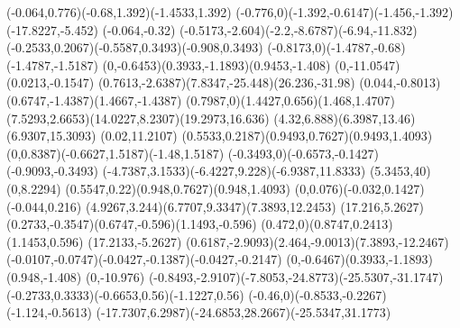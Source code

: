 {    \rcurveto(-0.064,0.776)(-0.68,1.392)(-1.4533,1.392) %
    \rcurveto(-0.776,0)(-1.392,-0.6147)(-1.456,-1.392) %
    \rlineto(-17.8227,-5.452) %
    \rlineto(-0.064,-0.32) %
    \rcurveto(-0.5173,-2.604)(-2.2,-8.6787)(-6.94,-11.832) %
    \rcurveto(-0.2533,0.2067)(-0.5587,0.3493)(-0.908,0.3493) %
    \rcurveto(-0.8173,0)(-1.4787,-0.68)(-1.4787,-1.5187) %
    \rcurveto(0,-0.6453)(0.3933,-1.1893)(0.9453,-1.408) %
    \rlineto(0,-11.0547) %
    \rlineto(0.0213,-0.1547) %
    \rcurveto(0.7613,-2.6387)(7.8347,-25.448)(26.236,-31.98) %
    \rcurveto(0.044,-0.8013)(0.6747,-1.4387)(1.4667,-1.4387) %
    \rcurveto(0.7987,0)(1.4427,0.656)(1.468,1.4707) %
    \rcurveto(7.5293,2.6653)(14.0227,8.2307)(19.2973,16.636) %
    \rcurveto(4.32,6.888)(6.3987,13.46)(6.9307,15.3093) %
    \rlineto(0.02,11.2107) %
    \rcurveto(0.5533,0.2187)(0.9493,0.7627)(0.9493,1.4093) %
    \rcurveto(0,0.8387)(-0.6627,1.5187)(-1.48,1.5187) %
    \rcurveto(-0.3493,0)(-0.6573,-0.1427)(-0.9093,-0.3493) %
    \rcurveto(-4.7387,3.1533)(-6.4227,9.228)(-6.9387,11.8333) %
    \closepath %
    \moveto(5.3453,40) %
    \rlineto(0,8.2294) %
    \rcurveto(0.5547,0.22)(0.948,0.7627)(0.948,1.4093) %
    \rcurveto(0,0.076)(-0.032,0.1427)(-0.044,0.216) %
    \rcurveto(4.9267,3.244)(6.7707,9.3347)(7.3893,12.2453) %
    \rlineto(17.216,5.2627) %
    \rcurveto(0.2733,-0.3547)(0.6747,-0.596)(1.1493,-0.596) %
    \rcurveto(0.472,0)(0.8747,0.2413)(1.1453,0.596) %
    \rlineto(17.2133,-5.2627) %
    \rcurveto(0.6187,-2.9093)(2.464,-9.0013)(7.3893,-12.2467) %
    \rcurveto(-0.0107,-0.0747)(-0.0427,-0.1387)(-0.0427,-0.2147) %
    \rcurveto(0,-0.6467)(0.3933,-1.1893)(0.948,-1.408) %
    \rlineto(0,-10.976) %
    \rcurveto(-0.8493,-2.9107)(-7.8053,-24.8773)(-25.5307,-31.1747) %
    \rcurveto(-0.2733,0.3333)(-0.6653,0.56)(-1.1227,0.56) %
    \rcurveto(-0.46,0)(-0.8533,-0.2267)(-1.124,-0.5613) %
    \rcurveto(-17.7307,6.2987)(-24.6853,28.2667)(-25.5347,31.1773) %
    \closepath %
}
